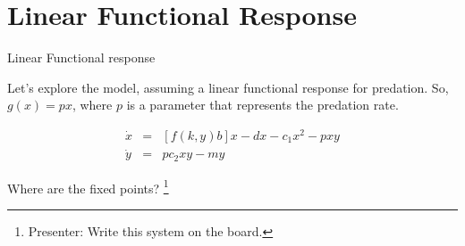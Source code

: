 \documentclass{beamer}
\begin{document}
\section{Linear Functional Response}
\begin{frame}{Linear Functional response}

Let's explore the model, assuming a linear functional response for predation. So, $g(x)=px$, where $p$ is a parameter that represents the predation rate. 

\[\begin{array}{rcl}
\dot{x}&=&[f(k,y)b]x-dx-c_1x^2-pxy\\
\dot{y}&=&pc_2xy-my
\end{array}\]

Where are the fixed points? \footnote{Presenter: Write this system on the board.} 



\end{frame}
\end{document}
